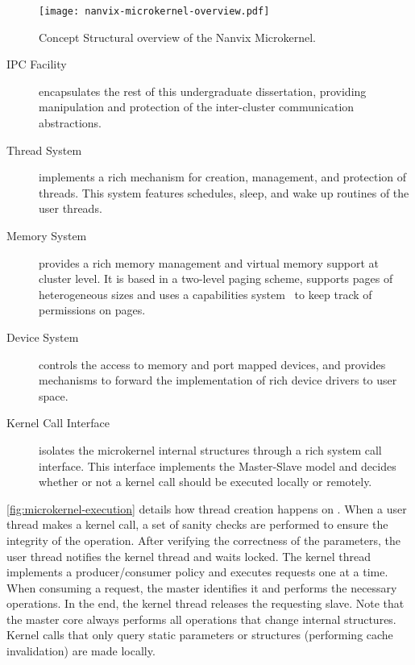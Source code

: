 		\begin{figure}[!tb]
			\centering%
			\caption{Concept Structural overview of the Nanvix Microkernel.}%
			\label{fig:microkernel-overview}%
			\texttt{[image: nanvix-microkernel-overview.pdf]}%
		\end{figure}

		\begin{description}

			\item[IPC Facility]
				encapsulates the rest of this undergraduate dissertation, providing
				manipulation and protection of the inter-cluster communication abstractions.
				
			\item[Thread System]
				implements a rich mechanism for creation, management, and protection of threads.
				This system features schedules, sleep, and wake up routines of the user threads.
				
			\item[Memory System]
				provides a rich memory management and virtual memory support at cluster level.
				It is based in a two-level paging scheme, supports pages of heterogeneous sizes
				and uses a capabilities system~\cite{Baumann2009} to keep track of permissions on pages.

			\item[Device System]
				controls the access to memory and port mapped devices, and provides
				mechanisms to forward the implementation of rich device drivers to user space.

			\item[Kernel Call Interface]
				isolates the microkernel internal structures through a rich system call interface.
				This interface implements the Master-Slave \os model
				and decides whether or not a kernel call should be executed locally or remotely.

		\end{description}

		\autoref{fig:microkernel-execution} details how thread creation
		happens on \nanvixmicrokernel.
		When a user thread makes a kernel call, a set of sanity checks are performed
		to ensure the integrity of the operation.
		After verifying the correctness of the parameters, the user thread notifies
		the kernel thread and waits locked.
		The kernel thread implements a producer/consumer policy and executes requests
		one at a time.
		When consuming a request, the master identifies it and performs the necessary operations.
		In the end, the kernel thread releases the requesting slave.
		Note that the master core always performs all operations that change internal
		\os structures.
		Kernel calls that only query static parameters or structures (performing cache invalidation) are made locally.

